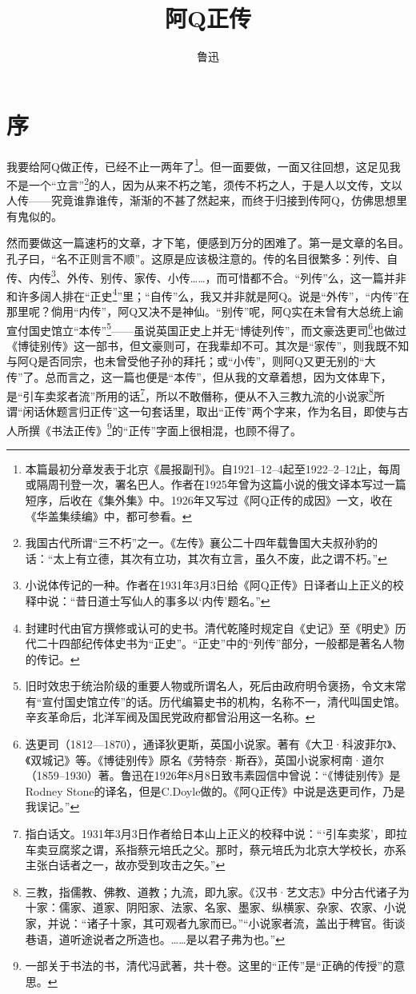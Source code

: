 \documentclass[12pt,UTF8]{ctexbook}
\title{\heiti\zihao{0} 阿Q正传}
\author{鲁迅}
\date{}
\begin{document}
\maketitle
\tableofcontents

\chapter{序}

我要给阿Q做正传，已经不止一两年了\footnote{本篇最初分章发表于北京《晨报副刊》。自1921--12--4起至1922--2--12止，每周或隔周刊登一次，署名巴人。作者在1925年曾为这篇小说的俄文译本写过一篇短序，后收在《集外集》中。1926年又写过《阿Q正传的成因》一文，收在《华盖集续编》中，都可参看。}。但一面要做，一面又往回想，这足见我不是一个“立言”\footnote{我国古代所谓“三不朽”之一。《左传》襄公二十四年载鲁国大夫叔孙豹的话：“太上有立德，其次有立功，其次有立言，虽久不废，此之谓不朽。”}的人，因为从来不朽之笔，须传不朽之人，于是人以文传，文以人传——究竟谁靠谁传，渐渐的不甚了然起来，而终于归接到传阿Q，仿佛思想里有鬼似的。

然而要做这一篇速朽的文章，才下笔，便感到万分的困难了。第一是文章的名目。孔子曰，“名不正则言不顺”。这原是应该极注意的。传的名目很繁多：列传、自传、内传\footnote{小说体传记的一种。作者在1931年3月3日给《阿Q正传》日译者山上正义的校释中说：“昔日道士写仙人的事多以‘内传’题名。”}、外传、别传、家传、小传……，而可惜都不合。“列传”么，这一篇并非和许多阔人排在“正史\footnote{封建时代由官方撰修或认可的史书。清代乾隆时规定自《史记》至《明史》历代二十四部纪传体史书为“正史”。“正史”中的“列传”部分，一般都是著名人物的传记。}”里；“自传”么，我又并非就是阿Q。说是“外传”，“内传”在那里呢？倘用“内传”，阿Q又决不是神仙。“别传”呢，阿Q实在未曾有大总统上谕宣付国史馆立“本传”\footnote{旧时效忠于统治阶级的重要人物或所谓名人，死后由政府明令褒扬，令文末常有“宣付国史馆立传”的话。历代编纂史书的机构，名称不一，清代叫国史馆。辛亥革命后，北洋军阀及国民党政府都曾沿用这一名称。}——虽说英国正史上并无“博徒列传”，而文豪迭更司\footnote{迭更司（1812—1870），通译狄更斯，英国小说家。著有《大卫·科波菲尔》、《双城记》等。《博徒别传》原名《劳特奈·斯吞》，英国小说家柯南·道尔（1859--1930）著。鲁迅在1926年8月8日致韦素园信中曾说：“《博徒别传》是Rodney Stone的译名，但是C.Doyle做的。《阿Q正传》中说是迭更司作，乃是我误记。”}也做过《博徒别传》这一部书，但文豪则可，在我辈却不可。其次是“家传”，则我既不知与阿Q是否同宗，也未曾受他子孙的拜托；或“小传”，则阿Q又更无别的“大传”了。总而言之，这一篇也便是“本传”，但从我的文章着想，因为文体卑下，是“引车卖浆者流”所用的话\footnote{指白话文。1931年3月3日作者给日本山上正义的校释中说：“‘引车卖浆’，即拉车卖豆腐浆之谓，系指蔡元培氏之父。那时，蔡元培氏为北京大学校长，亦系主张白话者之一，故亦受到攻击之矢。”}，所以不敢僭称，便从不入三教九流的小说家\footnote{三教，指儒教、佛教、道教；九流，即九家。《汉书·艺文志》中分古代诸子为十家：儒家、道家、阴阳家、法家、名家、墨家、纵横家、杂家、农家、小说家，并说：“诸子十家，其可观者九家而已。”“小说家者流，盖出于稗官。街谈巷语，道听途说者之所造也。……是以君子弗为也。”}所谓“闲话休题言归正传”这一句套话里，取出“正传”两个字来，作为名目，即使与古人所撰《书法正传》\footnote{一部关于书法的书，清代冯武著，共十卷。这里的“正传”是“正确的传授”的意思。}的“正传”字面上很相混，也顾不得了。
\end{document}
